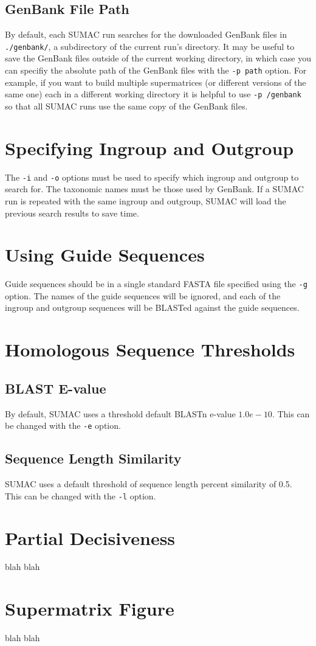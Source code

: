 \documentclass[10pt]{report}
\begin{document}
\subsection{GenBank File Path}

By default, each SUMAC run searches for the downloaded GenBank files
in \verb|./genbank/|, a subdirectory of the current run's directory.
It may be useful to save the GenBank files outside of the current working
directory, in which case 
you can specifiy the absolute path of the GenBank files with the \verb|-p path| option.
For example, if you want to build
multiple supermatrices (or different versions of the same one) each in a different working directory
it is helpful
to use \verb|-p /genbank| so that all SUMAC runs use the same copy of the GenBank files.

\section{Specifying Ingroup and Outgroup}

The \verb|-i| and \verb|-o| options must be used to specify which ingroup and
outgroup to search for. The taxonomic names must be those used by GenBank.
If a SUMAC run is repeated with the same ingroup and outgroup, SUMAC
will load the previous search results to save time.

\section{Using Guide Sequences}

Guide sequences should be in a single standard FASTA file specified
using the \verb|-g| option. The names of the
guide sequences will be ignored, and each of the ingroup and outgroup 
sequences will be BLASTed against the guide sequences.

\section{Homologous Sequence Thresholds}

\subsection{BLAST E-value}
By default, SUMAC uses a threshold default BLASTn e-value $1.0e-10$.
This can be changed with the \verb|-e| option.

\subsection{Sequence Length Similarity}
SUMAC uses a default threshold of sequence length percent similarity
of 0.5. This can be changed with the \verb|-l| option.

\section{Partial Decisiveness}
blah blah

\section{Supermatrix Figure}
blah blah


%


\end{document}
